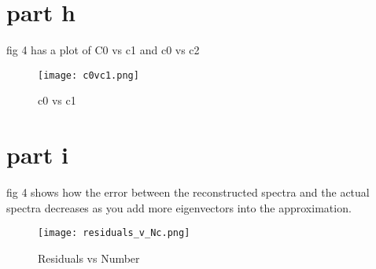 \documentclass{article}
\begin{document}
\section{part h}

fig 4 has a plot of C0 vs c1 and c0 vs c2
\begin{figure}[h!]
    \centering
    \texttt{[image: c0vc1.png]}
    \caption{c0 vs c1}
    \label{fig:enter-label}
\end{figure}

\section{part i}
fig 4 shows how the error between the reconstructed spectra and the actual spectra decreases as you add more eigenvectors into the approximation.

\begin{figure}
    \centering
    \texttt{[image: residuals\_v\_Nc.png]}
    \caption{Residuals vs Number}
    \label{fig:enter-label}
\end{figure}
\end{document}
